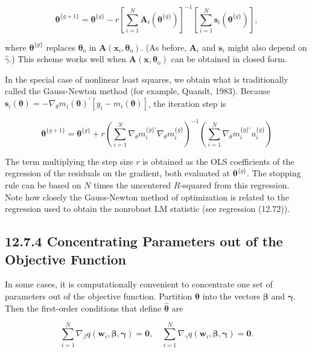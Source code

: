 \documentclass[10pt]{article}
\begin{document}
\begin{equation*}
\boldsymbol{\theta}^{\{g+1\}}=\boldsymbol{\theta}^{\{g\}}-r\left[\sum_{i=1}^{N} \mathbf{A}_{i}\left(\boldsymbol{\theta}^{\{g\}}\right)\right]^{-1}\left[\sum_{i=1}^{N} \mathbf{s}_{i}\left(\boldsymbol{\theta}^{\{g\}}\right)\right], \tag{12.86}
\end{equation*}


where $\boldsymbol{\theta}^{\{g\}}$ replaces $\boldsymbol{\theta}_{\mathrm{o}}$ in $\mathbf{A}\left(\mathbf{x}_{i}, \boldsymbol{\theta}_{\mathrm{o}}\right)$. (As before, $\mathbf{A}_{i}$ and $\mathbf{s}_{i}$ might also depend on $\hat{\gamma}$.) This scheme works well when $\mathbf{A}\left(\mathbf{x}, \boldsymbol{\theta}_{\mathrm{o}}\right)$ can be obtained in closed form.

In the special case of nonlinear least squares, we obtain what is traditionally called the Gauss-Newton method (for example, Quandt, 1983). Because $\mathbf{s}_{i}(\boldsymbol{\theta})= -\nabla_{\theta} m_{i}(\boldsymbol{\theta})^{\prime}\left[y_{i}-m_{i}(\boldsymbol{\theta})\right]$, the iteration step is

$$
\boldsymbol{\theta}^{\{g+1\}}=\boldsymbol{\theta}^{\{g\}}+r\left(\sum_{i=1}^{N} \nabla_{\theta} m_{i}^{\{g\} \prime} \nabla_{\theta} m_{i}^{\{g\}}\right)^{-1}\left(\sum_{i=1}^{N} \nabla_{\theta} m_{i}^{\{g\} \prime} u_{i}^{\{g\}}\right)
$$

The term multiplying the step size $r$ is obtained as the OLS coefficients of the regression of the residuals on the gradient, both evaluated at $\boldsymbol{\theta}^{\{g\}}$. The stopping rule can be based on $N$ times the uncentered $R$-squared from this regression. Note how closely the Gauss-Newton method of optimization is related to the regression used to obtain the nonrobust LM statistic (see regression (12.72)).

\subsection*{12.7.4 Concentrating Parameters out of the Objective Function}
In some cases, it is computationally convenient to concentrate one set of parameters out of the objective function. Partition $\boldsymbol{\theta}$ into the vectors $\boldsymbol{\beta}$ and $\boldsymbol{\gamma}$. Then the first-order conditions that define $\hat{\boldsymbol{\theta}}$ are


\begin{equation*}
\sum_{i=1}^{N} \nabla_{\beta} q\left(\mathbf{w}_{i}, \boldsymbol{\beta}, \boldsymbol{\gamma}\right)=\mathbf{0}, \quad \sum_{i=1}^{N} \nabla_{\gamma} q\left(\mathbf{w}_{i}, \boldsymbol{\beta}, \boldsymbol{\gamma}\right)=\mathbf{0} . \tag{12.87}
\end{equation*}
\end{document}
